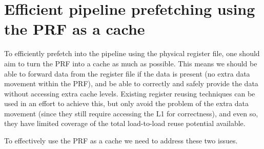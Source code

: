 \documentclass{sig-alternate}
\begin{document}


























\section{Efficient pipeline prefetching using the PRF as a cache}
To efficiently prefetch into the pipeline using the physical register file, one should aim to turn the PRF into a cache as much as possible. This means we should be able to forward data from the register file if the data is present (no extra data movement within the PRF), and be able to correctly and safely provide the data without accessing extra cache levels. Existing register reusing techniques can be used in an effort to achieve this, but only avoid the problem of the extra data movement (since they still require accessing the L1 for correctness), and even so, they have limited coverage of the total load-to-load reuse potential available.

To effectively use the PRF as a cache we need to address these two issues.
\end{document}
